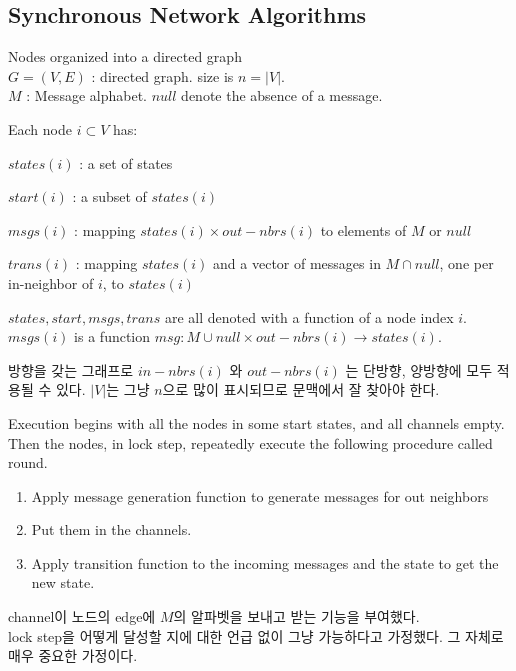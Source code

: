 \documentclass{report}
\theoremstyle{plain}
\theoremstyle{definition}
\theoremstyle{remark}
\begin{document}
\subsection{Synchronous Network Algorithms}

Nodes organized into a directed graph \\ 
$G=(V, E)$ : directed graph. size is $n=|V|$.  \\
$M$ : Message alphabet. $null$ denote the absence of a message. 

Each node $i \subset V $ has: 
\begin{description}
  \item $states(i)$ : a set of states 
  \item $start(i)$  : a subset of $states(i)$ 
  \item $msgs(i)$   : mapping $states(i) \times out-nbrs(i)$ 
  to elements of $M$ or $null$
  \item $trans(i)$  : mapping $states(i)$ and a vector of messages in 
  $M \cap {null}$, one per in-neighbor of $i$, to $states(i)$
\end{description}

\begin{tcolorbox}[title=노트]
$states, start, msgs, trans$ are all denoted with a function of a node index $i$. 
$msgs(i)$ is a function $ msg: M\cup{null} \times out-nbrs(i) \rightarrow states(i)$.

방향을 갖는 그래프로 $in-nbrs(i)$ 와 $out-nbrs(i)$ 는 단방향, 양방향에 모두 적용될 수 있다. 
$|V|$는 그냥 $n$으로 많이 표시되므로 문맥에서 잘 찾아야 한다. 
\end{tcolorbox}

Execution begins with all the nodes in some start states, and all channels empty. Then
the nodes, in lock step, repeatedly execute the following procedure called round.
\begin{enumerate}
    \item Apply message generation function to generate messages for out neighbors
    \item Put them in the channels.
    \item Apply transition function to the incoming messages and the state to get 
the new state.
\end{enumerate}

\begin{tcolorbox}[title=노트]
channel이 노드의 edge에 $M$의 알파벳을 보내고 받는 기능을 부여했다.\\
lock step을 어떻게 달성할 지에 대한 언급 없이 그냥 가능하다고 가정했다. 
그 자체로 매우 중요한 가정이다. 
\end{tcolorbox}
\end{document}

